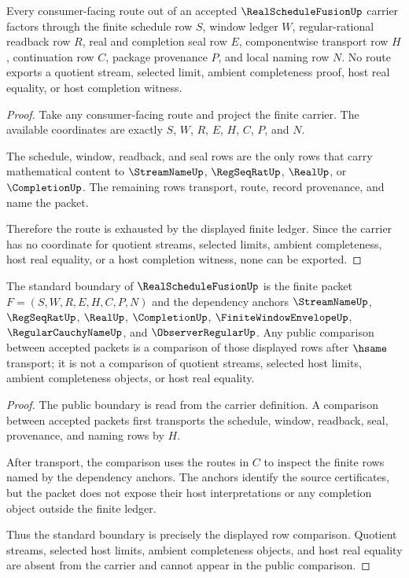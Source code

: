 \begin{theorem}
\label{thm:realschedulefusion-ledger-non-escape}
Every consumer-facing route out of an accepted $\RealScheduleFusionUp$ carrier factors through the finite schedule row $S$, window ledger $W$, regular-rational readback row $R$, real and completion seal row $E$, componentwise transport row $H$, continuation row $C$, package provenance $P$, and local naming row $N$. No route exports a quotient stream, selected limit, ambient completeness proof, host real equality, or host completion witness.
\end{theorem}
\begin{proof}
Take any consumer-facing route and project the finite carrier. The available coordinates are exactly $S$, $W$, $R$, $E$, $H$, $C$, $P$, and $N$.

The schedule, window, readback, and seal rows are the only rows that carry mathematical content to $\StreamNameUp$, $\RegSeqRatUp$, $\RealUp$, or $\CompletionUp$. The remaining rows transport, route, record provenance, and name the packet.

Therefore the route is exhausted by the displayed finite ledger. Since the carrier has no coordinate for quotient streams, selected limits, ambient completeness, host real equality, or a host completion witness, none can be exported.
\end{proof}

\begin{theorem}
\label{thm:realschedulefusion-standard-boundary}
The standard boundary of $\RealScheduleFusionUp$ is the finite packet $F=(S,W,R,E,H,C,P,N)$ and the dependency anchors $\StreamNameUp$, $\RegSeqRatUp$, $\RealUp$, $\CompletionUp$, $\FiniteWindowEnvelopeUp$, $\RegularCauchyNameUp$, and $\ObserverRegularUp$. Any public comparison between accepted packets is a comparison of those displayed rows after $\hsame$ transport; it is not a comparison of quotient streams, selected host limits, ambient completeness objects, or host real equality.
\end{theorem}
\begin{proof}
The public boundary is read from the carrier definition. A comparison between accepted packets first transports the schedule, window, readback, seal, provenance, and naming rows by $H$.

After transport, the comparison uses the routes in $C$ to inspect the finite rows named by the dependency anchors. The anchors identify the source certificates, but the packet does not expose their host interpretations or any completion object outside the finite ledger.

Thus the standard boundary is precisely the displayed row comparison. Quotient streams, selected host limits, ambient completeness objects, and host real equality are absent from the carrier and cannot appear in the public comparison.
\end{proof}

